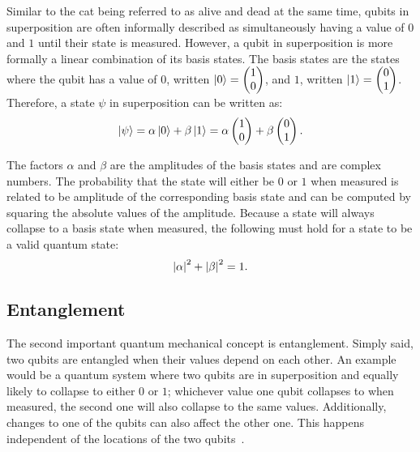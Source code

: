 Similar to the cat being referred to as alive and dead at the same time, qubits in superposition are often informally described as simultaneously  having a value of $0$ and $1$ until their state is measured. However, a qubit in superposition is more formally a linear combination of its basis states. The basis states are the states where the qubit has a value of $0$, written $\ket{0} = \begin{pmatrix} 1 \\ 0 \end{pmatrix}$, and $1$, written $\ket{1} = \begin{pmatrix} 0 \\ 1 \end{pmatrix}$. Therefore, a state $\psi$ in superposition can be written as:
\begin{equation*}
    \ket{\psi} = \alpha \ket{0} + \beta \ket{1} = \alpha \begin{pmatrix} 1 \\ 0 \end{pmatrix} + \beta \begin{pmatrix} 0 \\ 1 \end{pmatrix}.
\end{equation*}

The factors $\alpha$ and $\beta$ are the amplitudes of the basis states and are complex numbers. The probability that the state will either be $0$ or $1$ when measured is related to be amplitude of the corresponding basis state and can be computed by squaring the absolute values of the amplitude. Because a state will always collapse to a basis state when measured, the following must hold for a state to be a valid quantum state:
\begin{equation*}
    \abs{\alpha}^2 + \abs{\beta}^2 = 1.
\end{equation*}

\subsection{Entanglement}
The second important quantum mechanical concept is entanglement. Simply said, two qubits are entangled when their values depend on each other. An example would be a quantum system where two qubits are in superposition and equally likely to collapse to either $0$ or $1$; whichever value one qubit collapses to when measured, the second one will also collapse to the same values. Additionally, changes to one of the qubits can also affect the other one. This happens independent of the locations of the two qubits~\cite{RDB*22, HHHH09}. 

